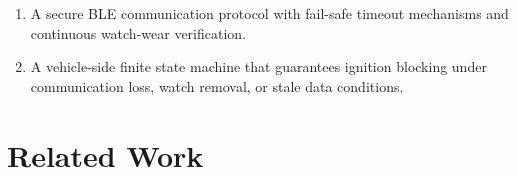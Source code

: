 \documentclass[HARVARD,Times2COL]{WileyNJDv5} %
\providecommand{\DIFadd}[1]{{\protect\color{red} #1}} %
\providecommand{\DIFaddbegin}{} %
\providecommand{\DIFaddend}{} %
\providecommand{\DIFdelbegin}{} %
\providecommand{\DIFdelend}{} %
\providecommand{\DIFscaledelfig}{0.5}
\newlength{\DIFdelgraphicswidth} %
\newlength{\DIFdelgraphicsheight} %
\providecommand{\DIFaddincludegraphics}[2][]{{\color{blue}\fbox{\DIFOincludegraphics[#1]{#2}}}} %
\providecommand{\DIFdelincludegraphics}[2][]{%
\sbox{\DIFdelgraphicsbox}{\DIFOincludegraphics[#1]{#2}}%
\settoboxwidth{\DIFdelgraphicswidth}{\DIFdelgraphicsbox} %
\settoboxtotalheight{\DIFdelgraphicsheight}{\DIFdelgraphicsbox} %
\scalebox{\DIFscaledelfig}{%
\parbox[b]{\DIFdelgraphicswidth}{\usebox{\DIFdelgraphicsbox}\\[-\baselineskip] \rule{\DIFdelgraphicswidth}{0em}}\llap{\resizebox{\DIFdelgraphicswidth}{\DIFdelgraphicsheight}{%
\setlength{\unitlength}{\DIFdelgraphicswidth}%
\begin{picture}(1,1)%
\thicklines\linethickness{2pt} %
{\color[rgb]{1,0,0}\put(0,0){\framebox(1,1){}}}%
{\color[rgb]{1,0,0}\put(0,0){\line( 1,1){1}}}%
{\color[rgb]{1,0,0}\put(0,1){\line(1,-1){1}}}%
\end{picture}%
}\hspace*{3pt}}} %
} %
\DeclareRobustCommand{\DIFaddbegin}{\DIFOaddbegin \let\includegraphics\DIFaddincludegraphics} %
\DeclareRobustCommand{\DIFaddend}{\DIFOaddend \let\includegraphics\DIFOincludegraphics} %
\DeclareRobustCommand{\DIFdelbegin}{\DIFOdelbegin \let\includegraphics\DIFdelincludegraphics} %
\DeclareRobustCommand{\DIFdelend}{\DIFOaddend \let\includegraphics\DIFOincludegraphics} %
\begin{document}
\begin{enumerate}
{    }\DIFaddend \item \DIFdelbegin %
\DIFdelend \DIFaddbegin \DIFadd{A secure BLE communication protocol with fail-safe timeout mechanisms and continuous watch-wear verification.
    }\DIFaddend \item \DIFdelbegin %
\DIFdelend \DIFaddbegin \DIFadd{A vehicle-side finite state machine that guarantees ignition blocking under communication loss, watch removal, or stale data conditions.
}\DIFaddend \end{enumerate}
\section{Related Work} \label{sec21}
\DIFdelbegin %
\DIFdelend 
\end{document}
